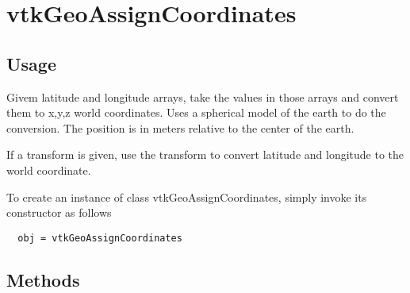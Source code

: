 \section{vtkGeoAssignCoordinates}

\subsection{Usage}

 Givem latitude and longitude arrays, 
 take the values in those arrays and convert them to x,y,z world coordinates.
 Uses a spherical model of the earth to do the conversion.
 The position is in meters relative to the center of the earth.

 If a transform is given, use the transform to convert latitude and longitude
 to the world coordinate.

To create an instance of class vtkGeoAssignCoordinates, simply
invoke its constructor as follows
\begin{verbatim}
  obj = vtkGeoAssignCoordinates
\end{verbatim}
\subsection{Methods}

